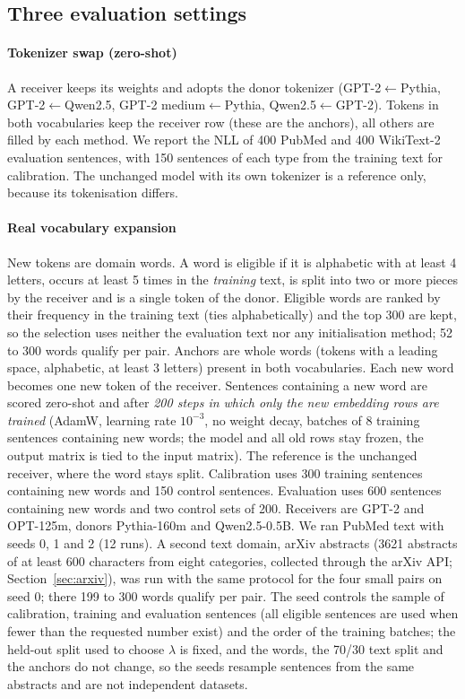 \documentclass[preprint,12pt]{elsarticle}
\begin{document}
\subsection{Three evaluation settings}
\paragraph{Tokenizer swap (zero-shot)} A receiver keeps its weights and adopts the donor tokenizer (GPT-2$\leftarrow$Pythia, GPT-2$\leftarrow$Qwen2.5, GPT-2 medium$\leftarrow$Pythia, Qwen2.5$\leftarrow$GPT-2). Tokens in both vocabularies keep the receiver row (these are the anchors), all others are filled by each method. We report the NLL of 400 PubMed and 400 WikiText-2 evaluation sentences, with 150 sentences of each type from the training text for calibration. The unchanged model with its own tokenizer is a reference only, because its tokenisation differs.

\paragraph{Real vocabulary expansion}\label{par:rvprotocol} New tokens are domain words. A word is eligible if it is alphabetic with at least 4 letters, occurs at least 5 times in the \emph{training} text, is split into two or more pieces by the receiver and is a single token of the donor. Eligible words are ranked by their frequency in the training text (ties alphabetically) and the top 300 are kept, so the selection uses neither the evaluation text nor any initialisation method; 52 to 300 words qualify per pair. Anchors are whole words (tokens with a leading space, alphabetic, at least 3 letters) present in both vocabularies. Each new word becomes one new token of the receiver. Sentences containing a new word are scored zero-shot and after \emph{200 steps in which only the new embedding rows are trained} (AdamW, learning rate $10^{-3}$, no weight decay, batches of 8 training sentences containing new words; the model and all old rows stay frozen, the output matrix is tied to the input matrix). The reference is the unchanged receiver, where the word stays split. Calibration uses 300 training sentences containing new words and 150 control sentences. Evaluation uses 600 sentences containing new words and two control sets of 200. Receivers are GPT-2 and OPT-125m, donors Pythia-160m and Qwen2.5-0.5B. We ran PubMed text with seeds 0, 1 and 2 (12 runs). A second text domain, arXiv abstracts (3621 abstracts of at least 600 characters from eight categories, collected through the arXiv API; Section~\ref{sec:arxiv}), was run with the same protocol for the four small pairs on seed 0; there 199 to 300 words qualify per pair. The seed controls the sample of calibration, training and evaluation sentences (all eligible sentences are used when fewer than the requested number exist) and the order of the training batches; the held-out split used to choose $\lambda$ is fixed, and the words, the 70/30 text split and the anchors do not change, so the seeds resample sentences from the same abstracts and are not independent datasets.
\end{document}
